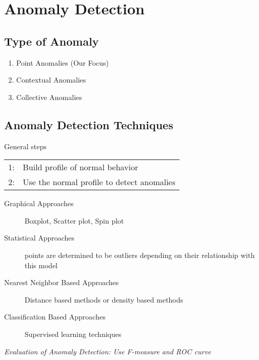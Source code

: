 \chapter{Anomaly Detection}

\section{Type of Anomaly}
\begin{enumerate}
\item Point Anomalies (Our Focus)
\item Contextual Anomalies
\item Collective Anomalies
\end{enumerate}

\section{Anomaly Detection Techniques}
\noindent General steps
\begin{table}[h!]
\begin{tabular}{r p{12cm}}
\hline
    1: & Build profile of normal behavior \\
    2: & Use the normal profile to detect anomalies \\
\hline
\end{tabular}
\end{table}

\begin{description}
\item[Graphical Approaches] Boxplot, Scatter plot, Spin plot
\item[Statistical Approaches] points are determined to be outliers depending on their relationship with this model
\item[Nearest Neighbor Based Approaches] Distance based methods or density based methods
\item[Classification Based Approaches] Supervised learning techniques
\end{description}
\textit{Evaluation of Anomaly Detection: Use F-measure and ROC curve}